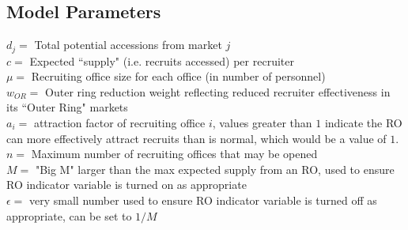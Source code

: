 \documentclass[11pt]{article}
\begin{document}
	\subsection*{Model Parameters}
	$d_j = $ Total potential accessions from market $j$ \\
	$c = $ Expected ``supply" (i.e. recruits accessed) per recruiter \\
	$\mu = $ Recruiting office size for each office (in number of personnel) \\
	$w_{OR} = $ Outer ring reduction weight reflecting reduced recruiter effectiveness in its ``Outer Ring" markets \\
	$a_i = $ attraction factor of recruiting office $i$, values greater than $1$ indicate the RO can more effectively attract recruits than is normal, which would be a value of $1$. \\
	$n =$ Maximum number of recruiting offices that may be opened \\
	$M =$ "Big M" larger than the max expected supply from an RO, used to ensure RO indicator variable is turned on as appropriate \\
	$\epsilon =$ very small number used to ensure RO indicator variable is turned off as appropriate, can be set to $1/M$ \\
	
		
\end{document}
